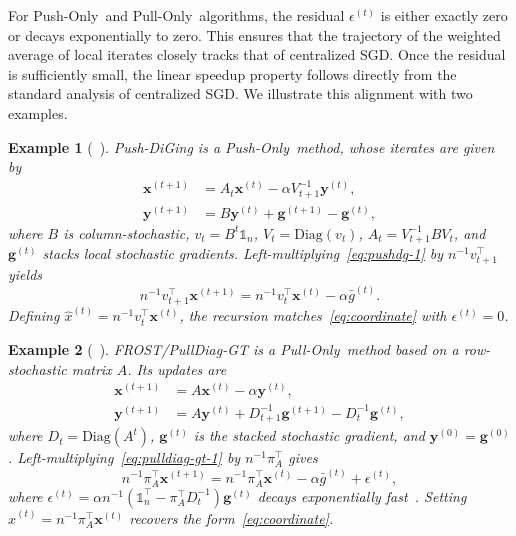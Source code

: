 \documentclass[10pt]{article}
\newtheorem{example}{Example}
\newcommand{\one}{\mathds{1}_n}
\newcommand{\vg}{{\mathbf{g}}}
\newcommand{\vx}{{\mathbf{x}}}
\newcommand{\vy}{{\mathbf{y}}}
\newcommand{\pushonly}{{\sc Push-Only}\xspace}
\newcommand{\pullonly}{{\sc Pull-Only}\xspace}
\begin{document}
For \pushonly\ and \pullonly\ algorithms, the residual  $\epsilon^{(t)}$ is either exactly zero or decays exponentially to zero. This ensures that the trajectory of the weighted average of local iterates closely tracks that of centralized SGD. Once the residual is sufficiently small, the linear speedup property follows directly from the standard analysis of centralized SGD. We illustrate this alignment with two examples.

\begin{example}[~\cite{Nedic2017pushdiging}]\label{exp1}
Push-DiGing is a \pushonly\ method, whose iterates are given by
\begin{subequations}
    \begin{align}
    \vx^{(t+1)} &= A_t\vx^{(t)} - \alpha V_{t+1}^{-1}\vy^{(t)}, \label{eq:pushdg-1}\\
    \vy^{(t+1)} &= B\vy^{(t)} + \vg^{(t+1)} - \vg^{(t)},
    \end{align}
\end{subequations}
where $B$ is column-stochastic, $v_t = B^t\one$, $V_t=\mathrm{Diag}(v_t)$, $A_t=V_{t+1}^{-1}BV_t$, and $\vg^{(t)}$ stacks local stochastic gradients. Left-multiplying~\eqref{eq:pushdg-1} by $n^{-1} v_{t+1}^\top$ yields
\[
n^{-1}v_{t+1}^\top\vx^{(t+1)} = n^{-1}v_t^\top\vx^{(t)} - \alpha \bar{g}^{(t)}.
\]
Defining $\hat{x}^{(t)} = n^{-1} v_t^\top \vx^{(t)}$, the recursion matches~\eqref{eq:coordinate} with $\epsilon^{(t)}=0$.
\end{example}

\vspace{1mm}
\begin{example}[~\cite{li2019row, FROST-Xinran}] \label{exp2}
FROST/PullDiag-GT is a \pullonly\ method based on a row-stochastic matrix $A$. Its updates are
\begin{subequations}
    \begin{align}
    \vx^{(t+1)} &= A\vx^{(t)} - \alpha \vy^{(t)}, \label{eq:pulldiag-gt-1}\\
    \vy^{(t+1)} &= A\vy^{(t)} + D_{t+1}^{-1}\vg^{(t+1)} - D_t^{-1}\vg^{(t)},
    \end{align}
\end{subequations}
where $D_t=\mathrm{Diag}(A^t)$, $\vg^{(t)}$ is the stacked stochastic gradient, and $\vy^{(0)}=\vg^{(0)}$. Left-multiplying~\eqref{eq:pulldiag-gt-1} by $n^{-1}\pi_A^\top$ gives
\[
n^{-1}\pi_A^\top\vx^{(t+1)} = n^{-1}\pi_A^\top\vx^{(t)} - \alpha \bar{g}^{(t)} + \epsilon^{(t)},
\]
where $\epsilon^{(t)} = \alpha n^{-1}(\one^\top - \pi_A^\top D_t^{-1})\vg^{(t)}$ decays exponentially fast~\cite[Lemma 12]{liang2025achieving}. Setting $\hat{x}^{(t)} = n^{-1}\pi_A^\top\vx^{(t)}$ recovers the form~\eqref{eq:coordinate}.
\end{example}
\end{document}
